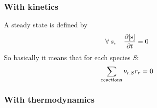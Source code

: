 \subsubsection{With kinetics}
A steady state is defined by
%
\begin{equation}
\forall\:s,\quad \doverdt{\conc[s]} = 0
\label{equilibrium:def}
\end{equation}
%
So basically it means that for each species $S$:
\begin{equation}
\sum_{\text{reactions}}\scoef[r,S] \rate[r] = 0
\end{equation}
%

\subsubsection{With thermodynamics}

